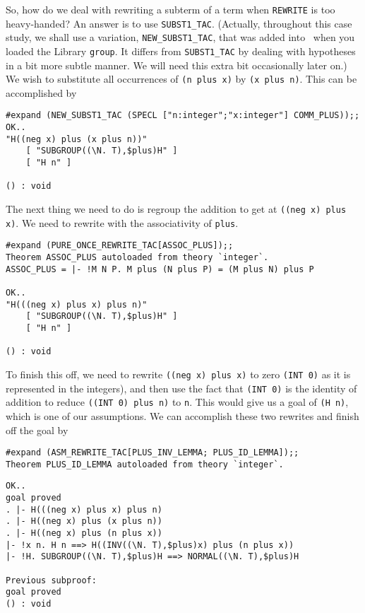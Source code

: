 So, how do we deal with rewriting a subterm of a term when
{\small\verb+REWRITE+} is too heavy-handed?  An answer is to use
{\small\verb+SUBST1_TAC+}.  (Actually, throughout this case study,
we shall use a variation, {\small\verb+NEW_SUBST1_TAC+}, that was
added into \HOL\ when you loaded the Library {\small\verb+group+}.
It differs from {\small\verb+SUBST1_TAC+} by dealing with
hypotheses in a bit more subtle manner.  We will need this extra bit
occasionally later on.)  We wish to substitute all occurrences of
{\small\verb+(n plus x)+} by {\small\verb+(x plus n)+}.
This can be accomplished by
\begin{session}
\begin{verbatim}
#expand (NEW_SUBST1_TAC (SPECL ["n:integer";"x:integer"] COMM_PLUS));;
OK..
"H((neg x) plus (x plus n))"
    [ "SUBGROUP((\N. T),$plus)H" ]
    [ "H n" ]

() : void
\end{verbatim}
\end{session}

The next thing we need to do is regroup the addition to get at
{\small\verb+((neg x) plus x)+}.  We need to rewrite with
the associativity of {\small\verb+plus+}.
\begin{session}
\begin{verbatim}
#expand (PURE_ONCE_REWRITE_TAC[ASSOC_PLUS]);;
Theorem ASSOC_PLUS autoloaded from theory `integer`.
ASSOC_PLUS = |- !M N P. M plus (N plus P) = (M plus N) plus P

OK..
"H(((neg x) plus x) plus n)"
    [ "SUBGROUP((\N. T),$plus)H" ]
    [ "H n" ]

() : void
\end{verbatim}
\end{session}

To finish this off, we need to rewrite
{\small\verb+((neg x) plus x)+} to zero 
{\small\verb+(INT 0)+} as it is represented in the integers), and
then use the fact that {\small\verb+(INT 0)+} is the identity of
addition to reduce {\small\verb+((INT 0) plus n)+} to {\small\tt n}.
This would give us a goal of {\small\verb+(H n)+}, which is one of
our assumptions.  We can accomplish these two rewrites and finish off
the goal by
\begin{session}
\begin{verbatim}
#expand (ASM_REWRITE_TAC[PLUS_INV_LEMMA; PLUS_ID_LEMMA]);;
Theorem PLUS_ID_LEMMA autoloaded from theory `integer`.
\end{verbatim}
\mvdots
\begin{verbatim}
OK..
goal proved
. |- H(((neg x) plus x) plus n)
. |- H((neg x) plus (x plus n))
. |- H((neg x) plus (n plus x))
|- !x n. H n ==> H((INV((\N. T),$plus)x) plus (n plus x))
|- !H. SUBGROUP((\N. T),$plus)H ==> NORMAL((\N. T),$plus)H

Previous subproof:
goal proved
() : void
\end{verbatim}
\end{session}

